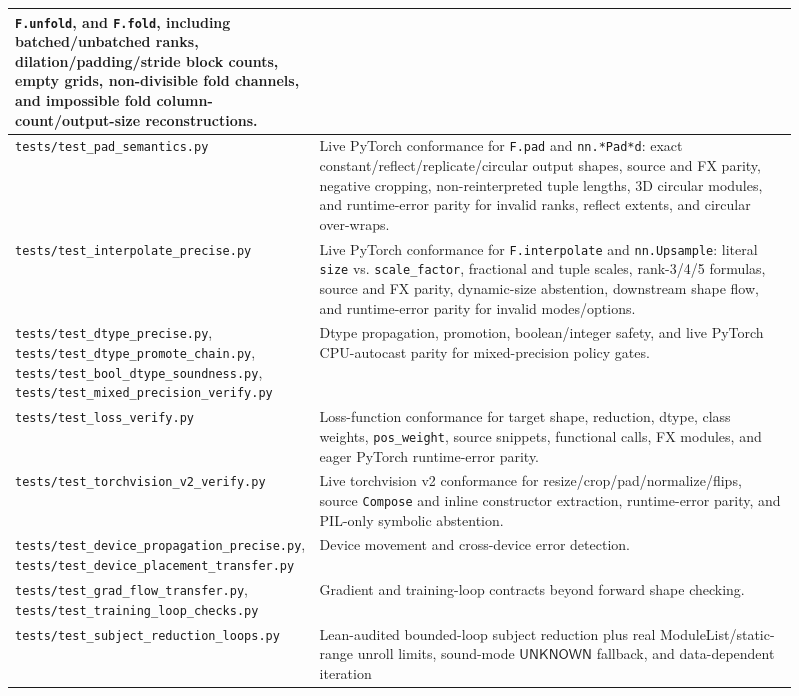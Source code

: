 \documentclass[11pt]{article}
\newcommand{\unknown}{\ensuremath{\mathsf{UNKNOWN}}}
\begin{document}
\begin{longtable}{|p{0.30\linewidth}|p{0.61\linewidth}|}
\texttt{F.unfold}, and \texttt{F.fold}, including batched/unbatched ranks,
dilation/padding/stride block counts, empty grids, non-divisible fold channels,
and impossible fold column-count/output-size reconstructions. \\
\hline
\texttt{tests/test\_pad\_semantics.py} &
Live PyTorch conformance for \texttt{F.pad} and \texttt{nn.*Pad*d}: exact
constant/reflect/replicate/circular output shapes, source and FX parity,
negative cropping, non-reinterpreted tuple lengths, 3D circular modules, and
runtime-error parity for invalid ranks, reflect extents, and circular over-wraps. \\
\hline
\texttt{tests/test\_interpolate\_precise.py} &
Live PyTorch conformance for \texttt{F.interpolate} and \texttt{nn.Upsample}:
literal \texttt{size} vs. \texttt{scale\_factor}, fractional and tuple scales,
rank-3/4/5 formulas, source and FX parity, dynamic-size abstention, downstream
shape flow, and runtime-error parity for invalid modes/options. \\
\hline
\texttt{tests/test\_dtype\_precise.py},
\texttt{tests/test\_dtype\_promote\_chain.py},
\texttt{tests/test\_bool\_dtype\_soundness.py},
\texttt{tests/test\_mixed\_precision\_verify.py} &
Dtype propagation, promotion, boolean/integer safety, and live PyTorch
CPU-autocast parity for mixed-precision policy gates. \\
\hline
\texttt{tests/test\_loss\_verify.py} &
Loss-function conformance for target shape, reduction, dtype, class weights,
\texttt{pos\_weight}, source snippets, functional calls, FX modules, and eager
PyTorch runtime-error parity. \\
\hline
\texttt{tests/test\_torchvision\_v2\_verify.py} &
Live torchvision v2 conformance for resize/crop/pad/normalize/flips, source
\texttt{Compose} and inline constructor extraction, runtime-error parity, and
PIL-only symbolic abstention. \\
\hline
\texttt{tests/test\_device\_propagation\_precise.py},
\texttt{tests/test\_device\_placement\_transfer.py} &
Device movement and cross-device error detection. \\
\hline
\texttt{tests/test\_grad\_flow\_transfer.py},
\texttt{tests/test\_training\_loop\_checks.py} &
Gradient and training-loop contracts beyond forward shape checking. \\
\hline
\texttt{tests/test\_subject\_reduction\_loops.py} &
Lean-audited bounded-loop subject reduction plus real ModuleList/static-range
unroll limits, sound-mode \unknown{} fallback, and data-dependent iteration

\end{longtable}
\end{document}
